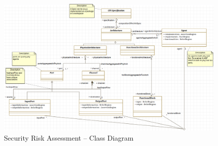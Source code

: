 \documentclass[conference]{IEEEtran}
\begin{document}

%
%
\appendix
\begin{figure}
	\centering
	\includegraphics[width=\textwidth]{secra_classDiagram.png}
	\caption{Security Risk Assessment -- Class Diagram}
	\label{fig:secraclassdiagram}
\end{figure}
\printbibliography
\end{document}
